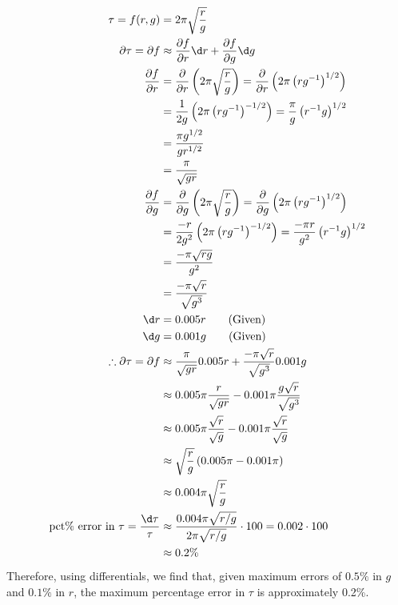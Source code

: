 \documentclass[a4paper, 11pt]{report}
\begin{document}
\newpage
{}
\sol
\begin{align*}
	\tau = f(r,g) &= 2\pi\sqrt{ \frac{r}{g} } \\
	\partial\tau = \partial f &\approx \del{f}{r}\d r + \del{f}{g}\d g \\
	\del{f}{r} &= \del{}{r}\bracks{2\pi\sqrt{ \frac{r}{g} }} 
		 = \del{}{r}\bracks{2\pi\bracks{rg^{-1}}^{1/2}} \\
		&= \frac{1}{2g}\bracks{2\pi\bracks{rg^{-1}}^{-1/2}} 
		 = \frac{\pi}{g}\bracks{r^{-1}g}^{1/2} \\
		&= \frac{\pi g^{1/2}}{gr^{1/2}} \\
		&= \frac{\pi}{\sqrt{gr}} \\
	\del{f}{g} &= \del{}{g}\bracks{2\pi\sqrt{\frac{r}{g}}} 
		 = \del{}{g}\bracks{2\pi\bracks{rg^{-1}}^{1/2}} \\
		&= \frac{-r}{2g^2}\bracks{2\pi\bracks{rg^{-1}}^{-1/2}} 
		 = \frac{-\pi r}{g^2}\bracks{r^{-1}g}^{1/2} \\
		&= \frac{-\pi\sqrt{rg}}{g^2} \\
		&= \frac{-\pi\sqrt{r}}{\sqrt{g^3}} \\
	\d r &= 0.005 r \tag*{(Given)} \\
	\d g &= 0.001 g \tag*{(Given)} \\
	\tf \partial\tau = \partial f &\approx \frac{\pi}{\sqrt{gr}}0.005 r + \frac{-\pi\sqrt{r}}{\sqrt{g^3}}0.001 g \\
		&\approx 0.005\pi \frac{r}{\sqrt{gr}} - 0.001\pi \frac{g\sqrt{r}}{\sqrt{g^3}} \\
		&\approx 0.005\pi \frac{\sqrt{r}}{\sqrt{g}} - 0.001\pi \frac{\sqrt{r}}{\sqrt{g}} \\
		&\approx \sqrt{\frac{r}{g}} \bracks{0.005\pi - 0.001\pi}  \\
		&\approx 0.004\pi \sqrt{\frac{r}{g}} \\
	\text{pct\% error in $\tau$} = \frac{\d \tau}{\tau} &\approx \frac{0.004\pi \sqrt{r/g}}{2\pi\sqrt{r/g}} \cd 100
		 = 0.002\cd100 \\
		&\approx 0.2\%
\end{align*}
Therefore, using differentials, we find that, given maximum errors of $0.5\%$ in $g$ and $0.1\%$ in $r$, the maximum percentage error in $\tau$ is approximately 0.2\%.
\end{document}
